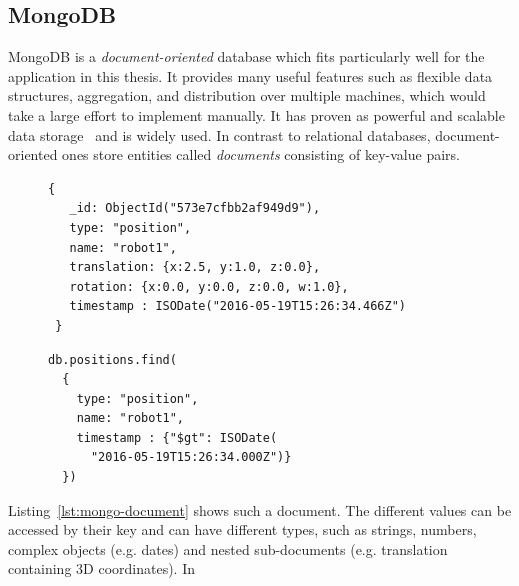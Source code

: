 \documentclass[a4paper,11pt]{article}
\newcommand{\reflst}[1]{Listing~\ref{#1}}
\begin{document}
\subsection{MongoDB}
\label{sec:mongodb}

MongoDB is a \emph{document-oriented}
database which fits particularly well for the application in this thesis. It
provides many useful features such as flexible data structures, aggregation,
and distribution over multiple machines, which would take a large effort to
implement manually. It has proven as powerful and scalable data
storage~\cite{mongodb,RoboDB} and is widely used. In contrast to
relational databases, document-oriented ones store entities called
\emph{documents} consisting of key-value pairs.
\begin{figure}
  \begin{minipage}{0.6\linewidth}
\begin{lstlisting}[style=SmallJSON,
  caption={MongoDB document representing\protect\\ the position of a robot},
  label=lst:mongo-document,
  framexleftmargin=2pt, xleftmargin=2pt,
 morekeywords={}, numbers=none]
 {
   _id: ObjectId("573e7cfbb2af949d9"),
   type: "position",
   name: "robot1",
   translation: {x:2.5, y:1.0, z:0.0},
   rotation: {x:0.0, y:0.0, z:0.0, w:1.0},
   timestamp : ISODate("2016-05-19T15:26:34.466Z")
 }
\end{lstlisting}
  \end{minipage}
  \begin{minipage}{0.4\linewidth}
\begin{lstlisting}[style=SmallJSON,
  caption={MongoDB query yielding the document in \reflst{lst:mongo-document}},
  label=lst:mongo-query,
  framexleftmargin=2pt, xleftmargin=10pt,
 morekeywords={}, numbers=none]
db.positions.find(
  {
    type: "position",
    name: "robot1",
    timestamp : {"$gt": ISODate(
      "2016-05-19T15:26:34.000Z")}
  })
\end{lstlisting}
  \end{minipage}
\end{figure}
\reflst{lst:mongo-document} shows such a document.
The different
values can be accessed by their key and can have different types, such
as strings, numbers, complex objects (e.g. dates) and nested
sub-documents (e.g. translation containing 3D coordinates). In
\end{document}
